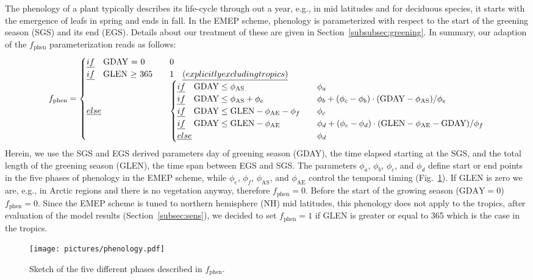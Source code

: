 \documentclass[gmd, manuscript]{copernicus}
\begin{document}
The phenology of a plant typically describes its life-cycle through out a year, e.g., in mid latitudes and for deciduous species, it starts with the emergence of leafs in spring and ends in fall. In the EMEP scheme, phenology is parameterized with respect to the start of the greening season (SGS) and its end (EGS). Details about our treatment of these are given in Section~\ref{subsubsec:greening}. In summary, our adaption of the $f_\text{phen}$ parameterization reads as follows:
%
\begin{equation}
  f_\text{phen} =
  \begin{cases}
    \emph{if} \quad \text{GDAY = 0}  & \quad 0 \\
    \emph{if} \quad \text{GLEN $\ge$ 365} & \quad 1 \quad \emph{(explicitly excluding tropics)} \\
    \emph{else}  & \quad 
    \begin{cases}
      \emph{if} \quad \text{GDAY} \le \phi_\text{AS}  & \quad \phi_a \\
      \emph{if} \quad \text{GDAY} \le \phi_\text{AS} + \phi_e  & \quad \phi_b+(\phi_c-\phi_b)\cdot(\text{GDAY}-\phi_\text{AS})/\phi_e\\
      \emph{if} \quad \text{GDAY} \le \text{GLEN} - \phi_\text{AE} - \phi_f  & \quad \phi_c\\
      \emph{if} \quad \text{GDAY} \le \text{GLEN} - \phi_\text{AE}  & \quad \phi_d+(\phi_c-\phi_d)\cdot(\text{GLEN}-\phi_\text{AE}-\text{GDAY})/\phi_f\\
      \emph{else} & \quad \phi_d
    \end{cases}
  \end{cases}
  \label{eq:fphen}
\end{equation}
%
Herein, we use the SGS and EGS derived parameters day of greening season (GDAY), the time elapsed starting at the SGS, and the total length of the greening season (GLEN), the time span between EGS and SGS. The parameters $\phi_a$, $\phi_b$, $\phi_c$, and $\phi_d$ define start or end points in the five phases of phenology in the EMEP scheme, while $\phi_e$, $\phi_f$, $\phi_\text{AS}$, and $\phi_\text{AE}$ control the temporal timing (Fig.~\ref{fig:phenology}). If GLEN is zero we are, e.g., in Arctic regions and there is no vegetation anyway, therefore $f_\text{phen}=0$. Before the start of the growing season ($\text{GDAY}=0$) $f_\text{phen}=0$. Since the EMEP scheme is tuned to northern hemisphere (NH) mid latitudes, this phenology does not apply to the tropics, after evaluation of the model results (Section~\ref{subsec:sens}), we decided to set $f_\text{phen}=1$ if GLEN is greater or equal to 365 which is the case in the tropics.
%
\begin{figure}[t]
  \texttt{[image: pictures/phenology.pdf]}
  \caption{Sketch of the five different phases described in $f_\text{phen}$.}
  \label{fig:phenology}
\end{figure}
\end{document}

